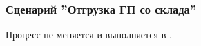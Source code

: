 




\subsubsection{Сценарий ''Отгрузка ГП со склада''}
\label{bp:goods_4}

Процесс не меняется и выполняется в \erp.




